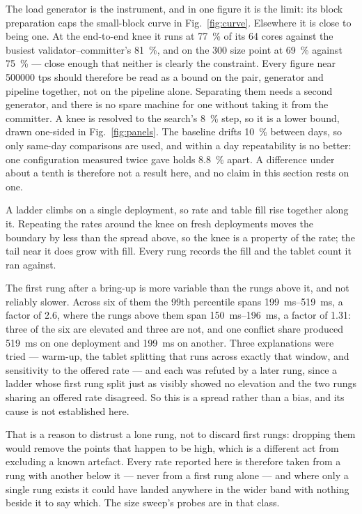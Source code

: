 \documentclass[10pt,twocolumn]{article}
\begin{document}
The load generator is the instrument, and in one figure it is the limit: its block preparation caps the
small-block curve in Fig.~\ref{fig:curve}. Elsewhere it is close to being one. At the end-to-end knee it runs at \SI{77}{\percent} of
its 64 cores against the busiest validator--committer's \SI{81}{\percent}, and on the
\SI{300}{\byte} size point at \SI{69}{\percent} against \SI{75}{\percent} --- close enough that
neither is clearly the constraint. Every figure near \num{500000} tps should therefore be read as a bound on the pair, generator
and pipeline together, not on the pipeline alone. Separating them needs a second generator, and there
is no spare machine for one without taking it from the committer. A
knee is resolved to the search's \SI{8}{\percent} step, so it is a lower bound, drawn one-sided in
Fig.~\ref{fig:panels}. The baseline drifts \SI{10}{\percent} between days, so only same-day
comparisons are used, and within a day repeatability is no better: one configuration measured twice
gave holds \SI{8.8}{\percent} apart. A difference under about a tenth is therefore not a result here,
and no claim in this section rests on one.

A ladder climbs on a single deployment, so rate and table fill rise together along it. Repeating the
rates around the knee on fresh deployments moves the boundary by less than the spread above, so the
knee is a property of the rate; the tail near it does grow with fill. Every rung records the fill and
the tablet count it ran against.

The first rung after a bring-up is more variable than the rungs above it, and not reliably slower. Across
six of them the 99th percentile spans \SIrange{199}{519}{\milli\second}, a factor of \num{2.6}, where the
rungs above them span \SIrange{150}{196}{\milli\second}, a factor of \num{1.31}: three of the six are
elevated and three are not, and one conflict share produced \SI{519}{\milli\second} on one deployment and
\SI{199}{\milli\second} on another. Three explanations were tried --- warm-up, the tablet splitting that
runs across exactly that window, and sensitivity to the offered rate --- and each was refuted by a later
rung, since a ladder whose first rung split just as visibly showed no elevation and the two rungs sharing
an offered rate disagreed. So this is a spread rather than a bias, and its cause is not established here.

That is a reason to distrust a lone rung, not to discard first rungs: dropping them would remove the
points that happen to be high, which is a different act from excluding a known artefact. Every rate
reported here is therefore taken from a rung with another below it --- never from a first rung alone ---
and where only a single rung exists it could have landed anywhere in the wider band with nothing beside it
to say which. The size sweep's probes are in that class.
\end{document}
